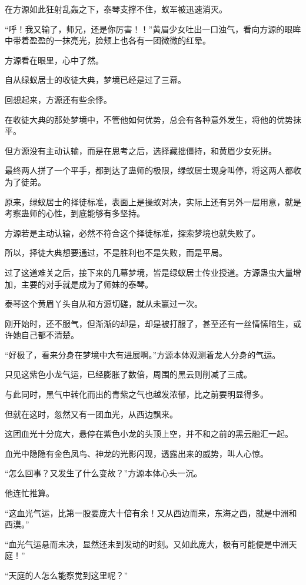\begin{this_body}
在方源如此狂射乱轰之下，泰琴支撑不住，蚁军被迅速消灭。

“呼！我又输了，师兄，还是你厉害！！”黄眉少女吐出一口浊气，看向方源的眼眸中带着盈盈的一抹亮光，脸颊上也各有一团微微的红晕。

方源看在眼里，心中了然。

自从绿蚁居士的收徒大典，梦境已经是过了三幕。

回想起来，方源还有些余悸。

在收徒大典的那处梦境中，不管他如何优势，总会有各种意外发生，将他的优势抹平。

但方源没有主动认输，而是在思考之后，选择藏拙僵持，和黄眉少女死拼。

最终两人拼了一个平手，都到达了蛊师的极限，绿蚁居士现身叫停，将这两人都收为了徒弟。

原来，绿蚁居士的择徒标准，表面上是操蚁对决，实际上还有另外一层用意，就是考察蛊师的心性，到底能够有多坚持。

方源若是主动认输，必然不符合这个择徒标准，探索梦境也就失败了。

所以，择徒大典想要通过，不是胜利也不是失败，而是平局。

过了这道难关之后，接下来的几幕梦境，皆是绿蚁居士传业授道。方源蛊虫大量增加，主要的对手就是成为了师妹的泰琴。

泰琴这个黄眉丫头自从和方源切磋，就从未赢过一次。

刚开始时，还不服气，但渐渐的却是，却是被打服了，甚至还有一丝情愫暗生，或许她自己都不清楚。

“好极了，看来分身在梦境中大有进展啊。”方源本体观测着龙人分身的气运。

只见这紫色小龙气运，已经膨胀了数倍，周围的黑云则削减了三成。

与此同时，黑气中转化而出的青紫之气也越发浓郁，比之前要明显得多。

但就在这时，忽然又有一团血光，从西边飘来。

这团血光十分庞大，悬停在紫色小龙的头顶上空，并不和之前的黑云融汇一起。

血光中隐隐有金色凤鸟、神龙的光影闪现，透露出来的威势，叫人心惊。

“怎么回事？又发生了什么变故？”方源本体心头一沉。

他连忙推算。

“这血光气运，比第一股要庞大十倍有余！又从西边而来，东海之西，就是中洲和西漠。”

“血光气运悬而未决，显然还未到发动的时刻。又如此庞大，极有可能便是中洲天庭！”

“天庭的人怎么能察觉到这里呢？”


\end{this_body}
